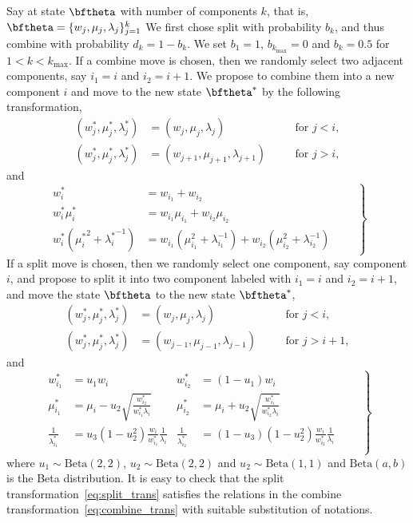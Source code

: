\documentclass[11pt, bib, fontset = Minion]{marticle}
\def\kmax{k_{\mathrm{max}}}
\begin{document}
  Say at state $\bftheta$ with number of components $k$, that is, $\bftheta =
  \{w_j, \mu_j, \lambda_j\}_{j=1}^k$ We first chose split with probability
  $b_k$, and thus combine with probability $d_k = 1 - b_k$.  We set $b_1 = 1$,
  $b_{\kmax} = 0$ and $b_k = 0.5$ for $1 < k < \kmax$. If a combine move is
  chosen, then we randomly select two adjacent components, say $i_1 = i$ and
  $i_2 = i + 1$. We propose to combine them into a new component $i$ and move
  to the new state $\bftheta^*$ by the following transformation,
  \begin{align*}
    (w_j^*, \mu_j^*, \lambda_j^*) &= (w_j, \mu_j, \lambda_j)
    && \quad\text{for }j < i, \\
    (w_j^*, \mu_j^*, \lambda_j^*) &= (w_{j+1}, \mu_{j+1}, \lambda_{j+1})
    && \quad\text{for }j > i,
  \end{align*}
  and
  \begin{equation}
    \left.\begin{aligned}
      w_i^* &= w_{i_1} + w_{i_2} \\
      w_i^*\mu_i^* &= w_{i_1}\mu_{i_1} + w_{i_2}\mu_{i_2} \\
      w_i^*({\mu_i^*}^2 + {\lambda_i^*}^{-1}) &=
      w_{i_1}(\mu_{i_1}^2 + \lambda_{i_1}^{-1}) +
      w_{i_2}(\mu_{i_2}^2 + \lambda_{i_2}^{-1})
    \end{aligned}\qquad\right\}\label{eq:combine_trans}
  \end{equation}
  If a split move is chosen, then we randomly select one component, say
  component $i$, and propose to split it into two component labeled with $i_1
  = i$ and $i_2 = i + 1$, and move the state $\bftheta$ to the new state
  $\bftheta^*$,
  \begin{align*}
    (w_j^*, \mu_j^*, \lambda_j^*) &= (w_j, \mu_j, \lambda_j)
    && \quad\text{for }j < i, \\
    (w_j^*, \mu_j^*, \lambda_j^*) &= (w_{j-1}, \mu_{j-1}, \lambda_{j-1})
    && \quad\text{for }j > i + 1,
  \end{align*}
  and
  \begin{equation}
    \left.\begin{aligned}
      w_{i_1}^* &= u_1w_i & w_{i_2}^* &= (1 - u_1)w_i \\
      \mu_{i_1}^* &=
      \mu_i - u_2\sqrt{\frac{w_{i_2}^*}{w_{i_1}^*\lambda_i}} &
      \mu_{i_2}^* &=
      \mu_i + u_2\sqrt{\frac{w_{i_1}^*}{w_{i_2}^*\lambda_i}} \\
      \frac{1}{\lambda_{i_1}^*} &=
      u_3(1 - u_2^2)\frac{w_i}{w_{i_1}^*}\frac{1}{\lambda_i} &
      \frac{1}{\lambda_{i_2}^*} &=
      (1 - u_3)(1 - u_2^2)\frac{w_i}{w_{i_2}^*}\frac{1}{\lambda_i}\\
    \end{aligned}\qquad\right\}\label{eq:split_trans}
  \end{equation}
  where $u_1\sim\mathrm{Beta}(2,2)$, $u_2\sim\mathrm{Beta}(2,2)$ and
  $u_2\sim\mathrm{Beta}(1,1)$ and $\mathrm{Beta}(a,b)$ is the Beta
  distribution. It is easy to check that the split
  transformation~\eqref{eq:split_trans} satisfies the relations in the combine
  transformation~\eqref{eq:combine_trans} with suitable substitution of
  notations.
\end{document}
